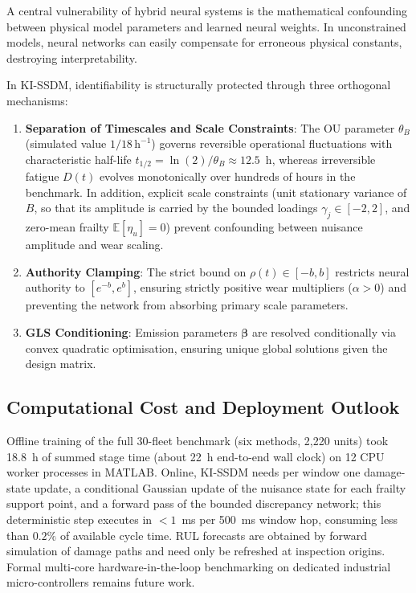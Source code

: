 \documentclass[a4paper,fleqn]{cas-dc}
\begin{document}
A central vulnerability of hybrid neural systems is the mathematical confounding between physical model parameters and learned neural weights. In unconstrained models, neural networks can easily compensate for erroneous physical constants, destroying interpretability.

In KI-SSDM, identifiability is structurally protected through three orthogonal mechanisms:
\begin{enumerate}[label=(\roman*),leftmargin=2.2em]
    \item \textbf{Separation of Timescales and Scale Constraints}: The OU parameter $\theta_B$ (simulated value $1/18\,\mathrm{h}^{-1}$) governs reversible operational fluctuations with characteristic half-life $t_{1/2} = \ln(2)/\theta_B \approx 12.5$~h, whereas irreversible fatigue $D(t)$ evolves monotonically over hundreds of hours in the benchmark. In addition, explicit scale constraints (unit stationary variance of $B$, so that its amplitude is carried by the bounded loadings $\gamma_j \in [-2, 2]$, and zero-mean frailty $\mathbb{E}[\eta_u] = 0$) prevent confounding between nuisance amplitude and wear scaling.
    \item \textbf{Authority Clamping}: The strict bound on $\rho(t) \in [-b, b]$ restricts neural authority to $[e^{-b}, e^b]$, ensuring strictly positive wear multipliers ($\alpha > 0$) and preventing the network from absorbing primary scale parameters.
    \item \textbf{GLS Conditioning}: Emission parameters $\boldsymbol{\beta}$ are resolved conditionally via convex quadratic optimisation, ensuring unique global solutions given the design matrix.
\end{enumerate}

\subsection{Computational Cost and Deployment Outlook}
\label{subsec:edge_deployment}

Offline training of the full 30-fleet benchmark (six methods, 2,220 units) took 18.8~h of summed stage time (about 22~h end-to-end wall clock) on 12 CPU worker processes in MATLAB. Online, KI-SSDM needs per window one damage-state update, a conditional Gaussian update of the nuisance state for each frailty support point, and a forward pass of the bounded discrepancy network; this deterministic step executes in $<1$~ms per 500~ms window hop, consuming less than $0.2\%$ of available cycle time. RUL forecasts are obtained by forward simulation of damage paths and need only be refreshed at inspection origins. Formal multi-core hardware-in-the-loop benchmarking on dedicated industrial micro-controllers remains future work.
\end{document}
